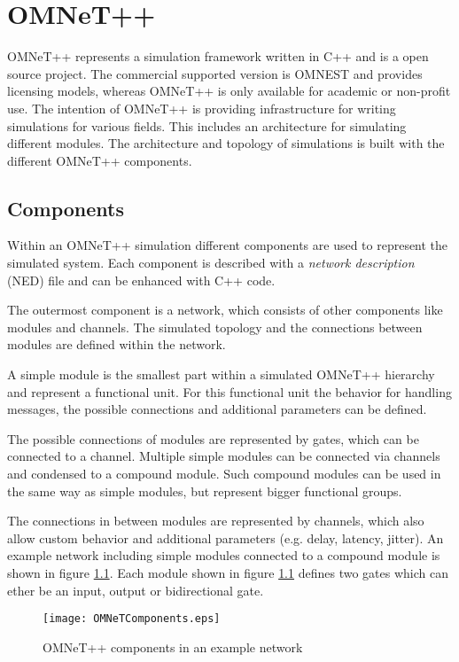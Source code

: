 \chapter{OMNeT++}

\label{sec:OMNeT}
OMNeT++ represents a simulation framework written in C++ and is a open source project.
The commercial supported version is OMNEST and provides licensing models, whereas OMNeT++ is only available for academic or non-profit use.
The intention of OMNeT++ is providing infrastructure for writing simulations for various fields.
This includes an architecture for simulating different modules.
The architecture and topology of simulations is built with the different OMNeT++ components.

\section{Components}
Within an OMNeT++ simulation different components are used to represent the simulated system.
Each component is described with a \emph{network description} (NED) file and can be enhanced with C++ code.

The outermost component is a network, which consists of other components like modules and channels.
The simulated topology and the connections between modules are defined within the network.

A simple module is the smallest part within a simulated OMNeT++ hierarchy and represent a functional unit.
For this functional unit the behavior for handling messages, the possible connections and additional parameters can be defined.

The possible connections of modules are represented by gates, which can be connected to a channel.
Multiple simple modules can be connected via channels and condensed to a compound module.
Such compound modules can be used in the same way as simple modules, but represent bigger functional groups.

The connections in between modules are represented by channels, which also allow custom behavior and additional parameters (e.g. delay, latency, jitter).
An example network including simple modules connected to a compound module is shown in figure \ref{fig:OMNeTComponents}.
Each module shown in figure \ref{fig:OMNeTComponents} defines two gates which can ether be an input, output or bidirectional gate.

\begin{figure}
    \centering
    \texttt{[image: OMNeTComponents.eps]}
    \caption{OMNeT++ components in an example network}
    \label{fig:OMNeTComponents}
\end{figure}

